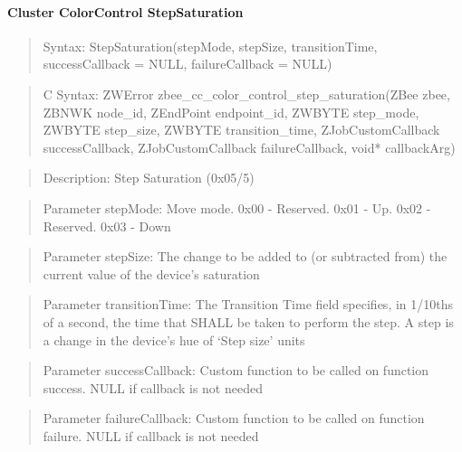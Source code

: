 \paragraph{Cluster ColorControl StepSaturation}
\begin{quote}Syntax: StepSaturation(stepMode, stepSize, transitionTime, successCallback = NULL, failureCallback = NULL)\end{quote}
\begin{quote}C Syntax: ZWError zbee\_cc\_color\_control\_step\_saturation(ZBee zbee, ZBNWK node\_id, ZEndPoint endpoint\_id, ZWBYTE step\_mode, ZWBYTE step\_size, ZWBYTE transition\_time, ZJobCustomCallback successCallback, ZJobCustomCallback failureCallback, void* callbackArg)\end{quote}
\begin{quote}Description: Step Saturation (0x05/5)\end{quote}
\begin{quote}Parameter stepMode: Move mode. 0x00 - Reserved. 0x01 - Up. 0x02 - Reserved. 0x03 - Down\end{quote}
\begin{quote}Parameter stepSize: The change to be added to (or subtracted from) the current value of the device’s saturation\end{quote}
\begin{quote}Parameter transitionTime: The Transition Time field specifies, in 1/10ths of a second, the time that SHALL be taken to perform the step. A step is a change in the device’s hue of ‘Step size’ units\end{quote}
\begin{quote}Parameter successCallback: Custom function to be called on function success. NULL if callback is not needed\end{quote}
\begin{quote}Parameter failureCallback: Custom function to be called on function failure. NULL if callback is not needed\end{quote}


